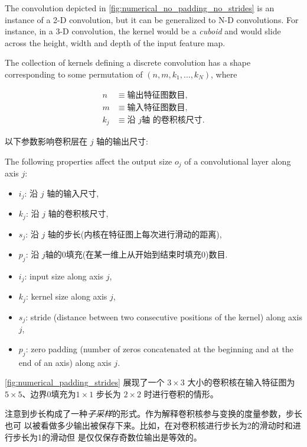\documentclass[notitlepage]{report}
\begin{document}
The convolution depicted in \autoref{fig:numerical_no_padding_no_strides} is an
instance of a 2-D convolution, but it can be generalized to N-D convolutions.
For instance, in a 3-D convolution, the kernel would be a {\em cuboid\/} and
would slide across the height, width and depth of the input feature map.

The collection of kernels defining a discrete convolution has a shape
corresponding to some permutation of $(n, m, k_1, \ldots, k_N)$, where

\begin{equation*}
\begin{split}
    n &\equiv \text{输出特征图数目},\\
    m &\equiv \text{输入特征图数目},\\
    k_j &\equiv \text{沿 $j$轴 的卷积核尺寸}.
\end{split}
\end{equation*}

以下参数影响卷积层在 $j$ 轴的输出尺寸:

The following properties affect the output size $o_j$ of a convolutional layer
along axis $j$:

\begin{itemize}
    \item $i_j$: 沿 $j$ 轴的输入尺寸,
    \item $k_j$: 沿 $j$ 轴的卷积核尺寸,
    \item $s_j$: 沿 $j$ 轴的步长(内核在特征图上每次进行滑动的距离),
    \item $p_j$: 沿 $j$轴的0填充(在某一维上从开始到结束时填充0)数目.
\end{itemize}

\begin{itemize}
    \item $i_j$: input size along axis $j$,
    \item $k_j$: kernel size along axis $j$,
    \item $s_j$: stride (distance between two consecutive positions of the
        kernel) along axis $j$,
    \item $p_j$: zero padding (number of zeros concatenated at the beginning and
        at the end of an axis) along axis $j$.
\end{itemize}

\autoref{fig:numerical_padding_strides} 展现了一个 $3
\times 3$ 大小的卷积核在输入特征图为 $5 \times 5$、边界0填充为$1 \times 1$
步长为 $2 \times 2$ 时进行卷积的情形。

注意到步长构成了一种\emph{子采样}的形式。作为解释卷积核参与变换的度量参数，步长也可
以被看做多少输出被保存下来。比如，在对卷积核进行步长为2的滑动时和进行步长为1的滑动但
是仅仅保存奇数位输出是等效的。
\end{document}
